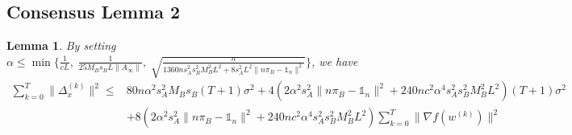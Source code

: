 \documentclass{article}
\newtheorem{lemma}[thm]{Lemma}
\newcommand{\norm}[1]{\| #1 \|}
\newcommand{\one}{\mathds{1}_n}
\begin{document}
\subsection{Consensus Lemma 2}
\begin{lemma}\label{basic Consensus Lemma 2}
  By setting $\alpha \leq \min\{\frac{1}{cL},\;\frac{1}{25M_Bs_BL\norm{A_{\infty}}},\; \sqrt{\frac{n}{1360ns_A^2s_B^2M_B^2L^2+8s_A^2L^2\norm{n\pi_B-\one}^2}}\} $, we have
  \begin{align*}
    \sum_{k=0}^T\norm{\Delta_x^{(k)}}^2 
  \leq &80n\alpha^2s_A^2M_Bs_B(T+1)\sigma^2+4\left(2\alpha^2s_A^2\norm{n\pi_B-\one}^2+240nc^2\alpha^4s_A^2s_B^2M_B^2L^2\right)(T+1)\sigma^2\\&+8\left(2\alpha^2s_A^2\norm{n\pi_B-\one}^2+240nc^2\alpha^4s_A^2s_B^2M_B^2L^2\right) \sum_{k=0}^T\norm{\nabla f(w^{(k)})}^2
\end{align*}
\end{lemma}
\end{document}
